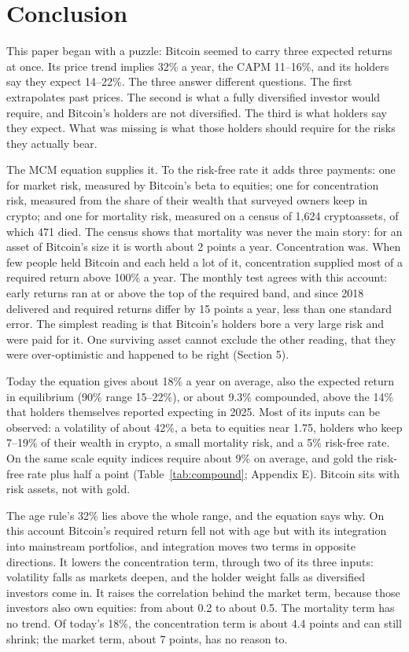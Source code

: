 \documentclass[11pt]{article}
\begin{document}
\section{Conclusion}

This paper began with a puzzle: Bitcoin seemed to carry three expected returns at once. Its price trend implies 32\% a year, the CAPM 11--16\%, and its holders say they expect 14--22\%. The three answer different questions. The first extrapolates past prices. The second is what a fully diversified investor would require, and Bitcoin's holders are not diversified. The third is what holders say they expect. What was missing is what those holders should require for the risks they actually bear.

The MCM equation supplies it. To the risk-free rate it adds three payments: one for market risk, measured by Bitcoin's beta to equities; one for concentration risk, measured from the share of their wealth that surveyed owners keep in crypto; and one for mortality risk, measured on a census of 1,624 cryptoassets, of which 471 died. The census shows that mortality was never the main story: for an asset of Bitcoin's size it is worth about 2 points a year. Concentration was. When few people held Bitcoin and each held a lot of it, concentration supplied most of a required return above 100\% a year. The monthly test agrees with this account: early returns ran at or above the top of the required band, and since 2018 delivered and required returns differ by 15 points a year, less than one standard error. The simplest reading is that Bitcoin's holders bore a very large risk and were paid for it. One surviving asset cannot exclude the other reading, that they were over-optimistic and happened to be right (Section 5).

Today the equation gives about 18\% a year on average, also the expected return in equilibrium (90\% range 15--22\%), or about 9.3\% compounded, above the 14\% that holders themselves reported expecting in 2025. Most of its inputs can be observed: a volatility of about 42\%, a beta to equities near 1.75, holders who keep 7--19\% of their wealth in crypto, a small mortality risk, and a 5\% risk-free rate. On the same scale equity indices require about 9\% on average, and gold the risk-free rate plus half a point (Table~\ref{tab:compound}; Appendix E). Bitcoin sits with risk assets, not with gold.

The age rule's 32\% lies above the whole range, and the equation says why. On this account Bitcoin's required return fell not with age but with its integration into mainstream portfolios, and integration moves two terms in opposite directions. It lowers the concentration term, through two of its three inputs: volatility falls as markets deepen, and the holder weight falls as diversified investors come in. It raises the correlation behind the market term, because those investors also own equities: from about 0.2 to about 0.5. The mortality term has no trend. Of today's 18\%, the concentration term is about 4.4 points and can still shrink; the market term, about 7 points, has no reason to.
\end{document}
